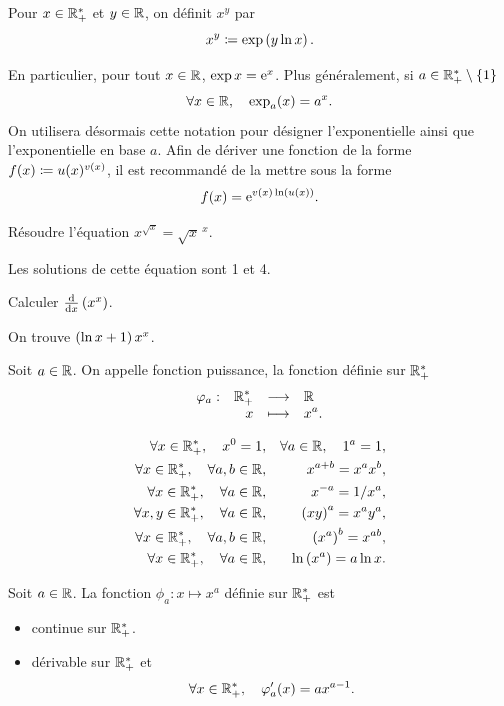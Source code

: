 \documentclass{magnolia}
\begin{document}
\begin{definition}[utile=-3]
Pour $x\in\mathbb{R}_+^*$ et $y\in\mathbb{R}$, on définit $x^y$ par
\[x^y\coloneqq\exp\left(y \ln x\right).\]
\end{definition}

\begin{remarques}
\remarque En particulier, pour tout $x\in\mathbb{R}$, $\exp x={\rm e}^x$. Plus généralement,
   si $a\in\mathbb{R}_+^*\setminus\left\{1\right\}$
   \[\forall x\in\mathbb{R} ,\quad \exp_a(x)=a^x.\]
   On utilisera désormais cette notation pour désigner l'exponentielle ainsi que
   l'exponentielle en base $a$.
\remarque Afin de dériver une fonction de la forme $f(x)\coloneqq u(x)^{v(x)}$, il est recommandé de la mettre sous la forme
  \[f(x)={\rm e}^{v(x)\ln\left(u(x)\right)}.\]
\end{remarques}

\begin{exos}
\exemple Résoudre l'équation $x^{\sqrt{x}}=\sqrt{x}^{\ x}$.
  \begin{sol}
  Les solutions de cette équation sont 1 et 4.
  \end{sol}
\exemple Calculer $\frac{{\rm d}}{{\rm d}x}\left(x^x\right)$.
  \begin{sol}
  On trouve $\left(\ln x+1\right)x^x$.
  \end{sol}
\end{exos}

\begin{definition}[utile=-3]
Soit $a\in\mathbb{R}$. On appelle fonction puissance, la fonction définie sur $\mathbb{R}_+^*$
\[\begin{array}[t]{lrcl} \displaystyle{\varphi_a} : & \displaystyle{\mathbb{R}_+^*} & \longrightarrow & \displaystyle{\mathbb{R}} \\ & \displaystyle{x} & \longmapsto & \displaystyle{x^a .} \end{array}\]
\end{definition}

\begin{proposition}[utile=-3]
\begin{eqnarray*}
\forall x\in\mathbb{R}_+^* ,\quad x^0=1, & & \forall a\in\mathbb{R} ,\quad 1^a=1,\\
\forall x\in\mathbb{R}_+^* ,\quad \forall a,b\in\mathbb{R}, & & x^{a+b}=x^a x^b,\\
\forall x\in\mathbb{R}_+^* ,\quad \forall a\in\mathbb{R}, & & x^{-a}=1/x^a,\\
\forall x,y\in\mathbb{R}_+^* ,\quad \forall a\in\mathbb{R}, & & \left(xy\right)^a=x^a y^a,\\
\forall x\in\mathbb{R}_+^* ,\quad \forall a,b\in\mathbb{R}, & & \left(x^a\right)^b=x^{ab},\\
\forall x\in\mathbb{R}_+^* ,\quad \forall a\in\mathbb{R}, & & \ln\left(x^a\right)=a\ln x .
\end{eqnarray*}
\end{proposition}

\begin{proposition}[utile=-3]
Soit $a\in\mathbb{R}$. La fonction $\phi_a:x\mapsto x^a$ définie sur $\mathbb{R}_+^*$ est
\begin{itemize}
\item continue sur $\mathbb{R}_+^*$.
\item dérivable sur $\mathbb{R}_+^*$ et
  \[\forall x\in\mathbb{R}_+^* ,\quad \varphi_a'(x)=a x^{a-1}.\]
\end{itemize}
\end{proposition}
\end{document}
